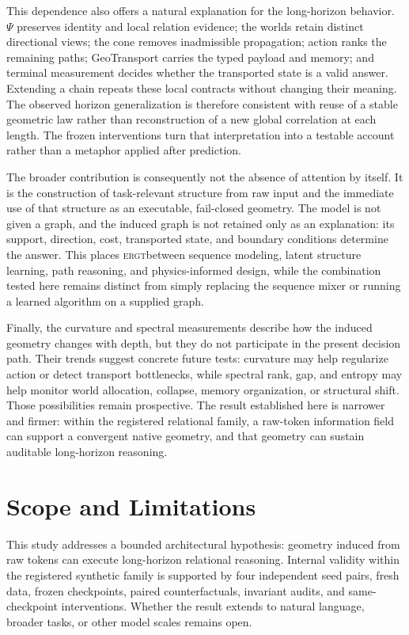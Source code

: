 \documentclass[11pt]{article}
\newcommand{\ERGT}{\textsc{ergt}}
\begin{document}
This dependence also offers a natural explanation for the long-horizon
behavior. $\Psi$ preserves identity and local relation evidence; the worlds
retain distinct directional views; the cone removes inadmissible propagation;
action ranks the remaining paths; GeoTransport carries the typed payload and
memory; and terminal measurement decides whether the transported state is a
valid answer. Extending a chain repeats these local contracts without changing
their meaning. The observed horizon generalization is therefore consistent
with reuse of a stable geometric law rather than reconstruction of a new global
correlation at each length. The frozen interventions turn that interpretation
into a testable account rather than a metaphor applied after prediction.

The broader contribution is consequently not the absence of attention by
itself. It is the construction of task-relevant structure from raw input and
the immediate use of that structure as an executable, fail-closed geometry.
The model is not given a graph, and the induced graph is not retained only as
an explanation: its support, direction, cost, transported state, and boundary
conditions determine the answer. This places \ERGT between sequence modeling,
latent structure learning, path reasoning, and physics-informed design, while
the combination tested here remains distinct from simply replacing the
sequence mixer or running a learned algorithm on a supplied graph.

Finally, the curvature and spectral measurements describe how the induced
geometry changes with depth, but they do not participate in the present
decision path. Their trends suggest concrete future tests: curvature may help
regularize action or detect transport bottlenecks, while spectral rank, gap,
and entropy may help monitor world allocation, collapse, memory organization,
or structural shift. Those possibilities remain prospective. The result
established here is narrower and firmer: within the registered relational
family, a raw-token information field can support a convergent native geometry,
and that geometry can sustain auditable long-horizon reasoning.

\section{Scope and Limitations}

This study addresses a bounded architectural hypothesis: geometry induced from
raw tokens can execute long-horizon relational reasoning. Internal validity
within the registered synthetic family is supported by four independent seed
pairs, fresh data, frozen checkpoints, paired counterfactuals, invariant audits,
and same-checkpoint interventions. Whether the result extends to natural
language, broader tasks, or other model scales remains open.
\end{document}
